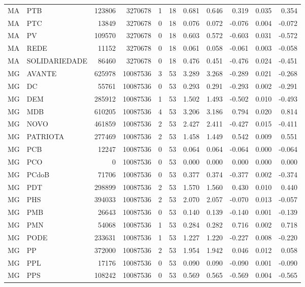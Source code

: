 \begin{landscape}
\begin{longtable}{llrrrrrrrrr}
MA & PTB & 123806 & 3270678 & 1 & 18 & 0.681 & 0.646 & 0.319 & 0.035 & 0.354 \\
MA & PTC & 13849 & 3270678 & 0 & 18 & 0.076 & 0.072 & -0.076 & 0.004 & -0.072 \\
MA & PV & 109570 & 3270678 & 0 & 18 & 0.603 & 0.572 & -0.603 & 0.031 & -0.572 \\
MA & REDE & 11152 & 3270678 & 0 & 18 & 0.061 & 0.058 & -0.061 & 0.003 & -0.058 \\
MA & SOLIDARIEDADE & 86460 & 3270678 & 0 & 18 & 0.476 & 0.451 & -0.476 & 0.024 & -0.451 \\
MG & AVANTE & 625978 & 10087536 & 3 & 53 & 3.289 & 3.268 & -0.289 & 0.021 & -0.268 \\
MG & DC & 55761 & 10087536 & 0 & 53 & 0.293 & 0.291 & -0.293 & 0.002 & -0.291 \\
MG & DEM & 285912 & 10087536 & 1 & 53 & 1.502 & 1.493 & -0.502 & 0.010 & -0.493 \\
MG & MDB & 610205 & 10087536 & 4 & 53 & 3.206 & 3.186 & 0.794 & 0.020 & 0.814 \\
MG & NOVO & 461859 & 10087536 & 2 & 53 & 2.427 & 2.411 & -0.427 & 0.015 & -0.411 \\
MG & PATRIOTA & 277469 & 10087536 & 2 & 53 & 1.458 & 1.449 & 0.542 & 0.009 & 0.551 \\
MG & PCB & 12247 & 10087536 & 0 & 53 & 0.064 & 0.064 & -0.064 & 0.000 & -0.064 \\
MG & PCO & 0 & 10087536 & 0 & 53 & 0.000 & 0.000 & 0.000 & 0.000 & 0.000 \\
MG & PCdoB & 71706 & 10087536 & 0 & 53 & 0.377 & 0.374 & -0.377 & 0.002 & -0.374 \\
MG & PDT & 298899 & 10087536 & 2 & 53 & 1.570 & 1.560 & 0.430 & 0.010 & 0.440 \\
MG & PHS & 394033 & 10087536 & 2 & 53 & 2.070 & 2.057 & -0.070 & 0.013 & -0.057 \\
MG & PMB & 26643 & 10087536 & 0 & 53 & 0.140 & 0.139 & -0.140 & 0.001 & -0.139 \\
MG & PMN & 54068 & 10087536 & 1 & 53 & 0.284 & 0.282 & 0.716 & 0.002 & 0.718 \\
MG & PODE & 233631 & 10087536 & 1 & 53 & 1.227 & 1.220 & -0.227 & 0.008 & -0.220 \\
MG & PP & 372000 & 10087536 & 2 & 53 & 1.954 & 1.942 & 0.046 & 0.012 & 0.058 \\
MG & PPL & 17176 & 10087536 & 0 & 53 & 0.090 & 0.090 & -0.090 & 0.001 & -0.090 \\
MG & PPS & 108242 & 10087536 & 0 & 53 & 0.569 & 0.565 & -0.569 & 0.004 & -0.565 \\

\end{longtable}
\end{landscape}
